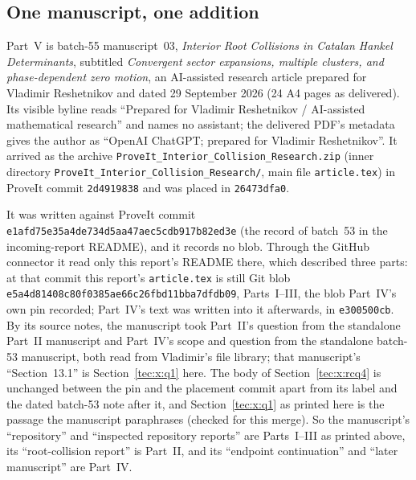 \documentclass[11pt,a4paper]{article}
\numberwithin{equation}{section}
\theoremstyle{definition}
\theoremstyle{remark}
\begin{document}
\subsection{One manuscript, one addition}\label{ic:sec:source}
Part~V is batch-55 manuscript~03, \emph{Interior Root Collisions in Catalan
Hankel Determinants}, subtitled \emph{Convergent sector expansions, multiple
clusters, and phase-dependent zero motion}, an AI-assisted research article
prepared for Vladimir Reshetnikov and dated 29 September 2026 (24 A4 pages as
delivered).  Its visible byline reads ``Prepared for Vladimir Reshetnikov /
AI-assisted mathematical research'' and names no assistant; the delivered
PDF's metadata gives the author as ``OpenAI ChatGPT; prepared for Vladimir
Reshetnikov''.  It arrived as the archive
\nolinkurl{ProveIt_Interior_Collision_Research.zip} (inner directory
\nolinkurl{ProveIt_Interior_Collision_Research/}, main file
\nolinkurl{article.tex}) in ProveIt commit \texttt{2d4919838} and was placed
in \texttt{26473dfa0}.

It was written against ProveIt commit
\texttt{e1afd75e35a4de734d5aa47aec5cdb917b82ed3e} (the record of batch~53 in
the incoming-report README), and it records no blob.  Through the GitHub
connector it read only this report's README there, which described three
parts: at that commit this report's \nolinkurl{article.tex} is still Git blob
\texttt{e5a4d81408c80f0385ae66c26fbd11bba7dfdb09}, Parts~I--III, the blob
Part~IV's own pin recorded; Part~IV's text was written into it afterwards,
in \texttt{e300500cb}.  By its source notes, the manuscript took Part~II's
question from the standalone Part~II manuscript and Part~IV's scope and
question from the standalone batch-53 manuscript, both read from Vladimir's
file library; that manuscript's ``Section~13.1'' is Section~\ref{tec:x:q1}
here.  The body of Section~\ref{tec:x:rcq4} is unchanged between the pin and
the placement commit apart from its label and the dated batch-53 note after
it, and Section~\ref{tec:x:q1} as printed here is the passage the manuscript
paraphrases (checked for this merge).  So the manuscript's ``repository''
and ``inspected repository reports'' are Parts~I--III as printed above, its
``root-collision report'' is Part~II, and its ``endpoint continuation'' and
``later manuscript'' are Part~IV.
\end{document}
